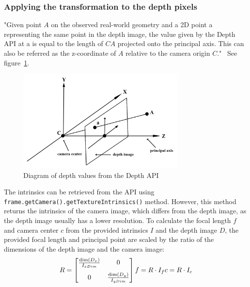 \subsubsection{Applying the transformation to the depth pixels}
"Given point $A$ on the observed real-world geometry and a 2D point a representing the same point in the depth image,
the value given by the Depth API at a is equal to the length of $CA$ projected onto the principal axis.
This can also be referred as the z-coordinate of $A$ relative to the camera origin $C$."~\parencite{google_llc_arcore_doc}
See figure~\ref{fig:diagram-depth-values}.
\begin{figure}[h]
    \centering
    \includegraphics[width=0.75\textwidth]{images/depth-values-diagram}
    \caption{Diagram of depth values from the Depth API}
    \label{fig:diagram-depth-values}
\end{figure}

The intrinsics can be retrieved from the API using \texttt{frame.getCamera().getTextureIntrinsics()} method.
However, this method returns the intrinsics of the camera image, which differs from the depth image, as the depth image usually has a lower resolution.
To calculate the focal length $f$ and camera center $c$ from the provided intrinsics $I$ and the depth image $D$,
the provided focal length and principal point are scaled by the ratio of the dimensions of the depth image and the camera image:
\begin{equation}
    R = \begin{bmatrix}
            \frac{\dim(D_x)}{I_{xDim}} & 0\\[8pt]
            0                          & \frac{\dim(D_y)}{I_{yDim}}
    \end{bmatrix}\\
    f = R \cdot I_f \\
    c = R \cdot I_c
\end{equation}

